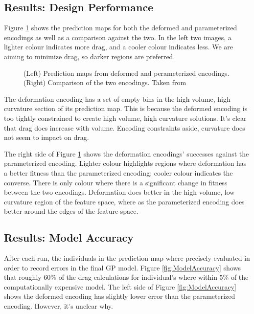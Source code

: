 \documentclass{sig-alternate}
\begin{document}
\subsection{Results: Design Performance}
Figure \ref{fig:DesignPerformance} shows the prediction maps for both the deformed and parameterized encodings as well as a comparison against the two.
In the left two images, a lighter colour indicates more drag, and a cooler colour indicates less.
We are aiming to minimize drag, so darker regions are preferred.

\begin{figure}[htb]
\centering
{}
\caption{(Left) Prediction maps from deformed and perameterized encodings. (Right) Comparison of the two encodings. Taken from \cite{Gaier:2018}}
\label{fig:DesignPerformance}
\end{figure}

The deformation encoding has a set of empty bins in the high volume, high curvature section of its prediction map.
This is because the deformed encoding is too tightly constrained to create high volume, high curvature solutions.
It's clear that drag does increase with volume.
Encoding constraints aside, curvature does not seem to impact on drag.

The right side of Figure \ref{fig:DesignPerformance} shows the deformation encodings' successes against the parameterized encoding.
Lighter colour highlights regions where deformation has a better fitness than the parameterized encoding;
cooler colour indicates the converse.
There is only colour where there is a significant change in fitness between the two encodings.
Deformation does better in the high volume, low curvature region of the feature space, where as the parameterized encoding does better around the edges of the feature space.

\subsection{Results: Model Accuracy}
After each run, the individuals in the prediction map where precisely evaluated in order to record errors in the final GP model.
Figure \ref{fig:ModelAccuracy} shows that roughly 60\% of the drag calculations for individual's where within 5\% of the computationally expensive model.
The left side of Figure \ref{fig:ModelAccuracy} shows the deformed encoding has slightly lower error than the parameterized encoding.
However, it's unclear why.
\end{document}
